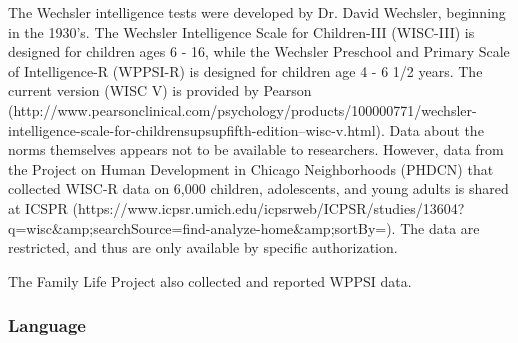 \documentclass[letterpaper,man,apacite]{apa6}
\begin{document}
The Wechsler intelligence tests were developed by Dr. David Wechsler, beginning in the 1930's. The Wechsler Intelligence Scale for Children-III (WISC-III) is designed for children ages 6 - 16, while the Wechsler Preschool and Primary Scale of Intelligence-R (WPPSI-R) is designed for children age 4 - 6 1/2 years.
The current version (WISC V) is provided by Pearson (http://www.pearsonclinical.com/psychology/products/100000771/wechsler-intelligence-scale-for-childrensupsupfifth-edition--wisc-v.html).
Data about the norms themselves appears not to be available to researchers.
However, data from the Project on Human Development in Chicago Neighborhoods (PHDCN) that collected WISC-R data on 6,000 children, adolescents, and young adults is shared at ICSPR (https://www.icpsr.umich.edu/icpsrweb/ICPSR/studies/13604?q=wisc&amp;searchSource=find-analyze-home&amp;sortBy=). 
The data are restricted, and thus are only available by specific authorization.

The Family Life Project also collected and reported WPPSI data.

\subsubsection{Language}
\end{document}
